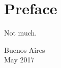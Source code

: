 \chapter{Preface}
\label{cha:preface}

Not much.

\begin{flushright}
  \bigskip
  Buenos Aires\\
  May 2017
\end{flushright}
